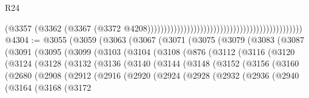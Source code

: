 \begin{lexlean}{R24}
\begin{coremodule}
                                                                                          (@3357
                                                                                            (@3362
                                                                                              (@3367
                                                                                                (@3372
                                                                                                  @4208)))))))))))))))))))))))))))))))))))))))))))))))
@4304 := @3055
    (@3059
      (@3063
        (@3067
          (@3071
            (@3075
              (@3079
                (@3083
                  (@3087
                    (@3091
                      (@3095
                        (@3099
                          (@3103
                            (@3104
                              (@3108
                                (@876
                                  (@3112
                                    (@3116
                                      (@3120
                                        (@3124
                                          (@3128
                                            (@3132
                                              (@3136
                                                (@3140
                                                  (@3144
                                                    (@3148
                                                      (@3152
                                                        (@3156
                                                          (@3160
                                                            (@2680
                                                              (@2908
                                                                (@2912
                                                                  (@2916
                                                                    (@2920
                                                                      (@2924
                                                                        (@2928
                                                                          (@2932
                                                                            (@2936
                                                                              (@2940
                                                                                (@3164
                                                                                  (@3168
                                                                                    (@3172

\end{coremodule}
\end{lexlean}
